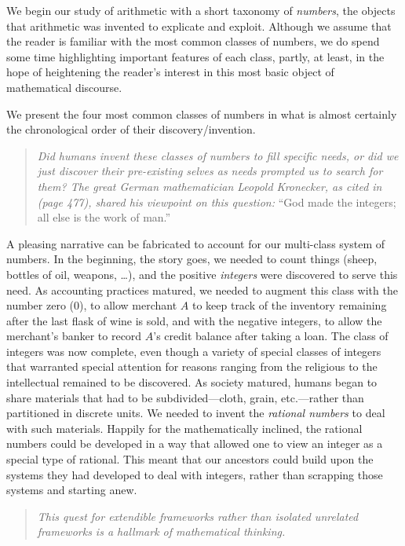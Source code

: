 We begin our study of arithmetic with a short taxonomy of {\it
  numbers}, the objects that arithmetic was invented to explicate and
exploit.  Although we assume that the reader is familiar with the most
common classes of numbers, we do spend some time highlighting
important features of each class, partly, at least, in the hope of
heightening the reader's interest in this most basic object of
mathematical discourse.

We present the four most common classes of numbers in what is almost
certainly the chronological order of their discovery/invention.
\begin{quote}
{\em Did humans {\em invent} these classes of numbers to fill specific
  needs, or did we just {\em discover} their pre-existing selves as
  needs prompted us to search for them?  The great German
  mathematician Leopold Kronecker,
as cited in \cite{Bell86} (page 477), shared his viewpoint on this
question:} ``God made the integers; all else is the work of man.''
\end{quote}
A pleasing narrative can be fabricated to account for our multi-class
system of numbers.  In the beginning, the story goes, we needed to
count things (sheep, bottles of oil, weapons, \ldots), and the
positive {\it integers} were discovered to serve
this need.  As accounting practices matured, we needed to augment this
class with the number zero  ($0$), to allow
merchant $A$ to keep track of the inventory remaining after the last
flask of wine is sold, and with the negative integers,
 to allow the merchant's banker to record $A$'s
credit balance after taking a loan.  The class of integers was now
complete, even though a variety of special classes of integers that
warranted special attention for reasons ranging from the religious to
the intellectual remained to be discovered.  As society matured,
humans began to share materials that had to be subdivided---cloth,
grain, etc.---rather than partitioned in discrete units.  We needed to
invent the {\it rational numbers} 
%
to deal with such materials.  Happily for the mathematically inclined,
the rational numbers could be developed in a way that allowed one to
view an integer as a special type of rational.  This meant that our
ancestors could build upon the systems they had developed to deal with
integers, rather than scrapping those systems and starting anew.
\begin{quote}
{\em This quest for {\em extendible} frameworks rather than isolated
  unrelated frameworks is a hallmark of mathematical thinking.}
\end{quote}
